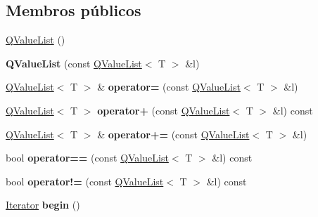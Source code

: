 \subsection*{Membros públicos}
\begin{DoxyCompactItemize}
\item 
\hyperlink{class_q_value_list_a45441fbf512c04334f495ba5901031b2}{Q\-Value\-List} ()
\item 
\hypertarget{class_q_value_list_a07510277968aa70dd9e2cb849ab81f75}{{\bfseries Q\-Value\-List} (const \hyperlink{class_q_value_list}{Q\-Value\-List}$<$ T $>$ \&l)}\label{class_q_value_list_a07510277968aa70dd9e2cb849ab81f75}

\item 
\hypertarget{class_q_value_list_aab25b9fcbb20ce1737cd022c1df6f1a5}{\hyperlink{class_q_value_list}{Q\-Value\-List}$<$ T $>$ \& {\bfseries operator=} (const \hyperlink{class_q_value_list}{Q\-Value\-List}$<$ T $>$ \&l)}\label{class_q_value_list_aab25b9fcbb20ce1737cd022c1df6f1a5}

\item 
\hypertarget{class_q_value_list_ae4cbfbf3fe68591b90f1595a68e8818a}{\hyperlink{class_q_value_list}{Q\-Value\-List}$<$ T $>$ {\bfseries operator+} (const \hyperlink{class_q_value_list}{Q\-Value\-List}$<$ T $>$ \&l) const }\label{class_q_value_list_ae4cbfbf3fe68591b90f1595a68e8818a}

\item 
\hypertarget{class_q_value_list_a07c5bb913041fa24a31da018a85ba114}{\hyperlink{class_q_value_list}{Q\-Value\-List}$<$ T $>$ \& {\bfseries operator+=} (const \hyperlink{class_q_value_list}{Q\-Value\-List}$<$ T $>$ \&l)}\label{class_q_value_list_a07c5bb913041fa24a31da018a85ba114}

\item 
\hypertarget{class_q_value_list_acf3cbcf4c11360354b90d148ad6d5d7e}{bool {\bfseries operator==} (const \hyperlink{class_q_value_list}{Q\-Value\-List}$<$ T $>$ \&l) const }\label{class_q_value_list_acf3cbcf4c11360354b90d148ad6d5d7e}

\item 
\hypertarget{class_q_value_list_a2e64db9b439c3f2b205a6b254776f61d}{bool {\bfseries operator!=} (const \hyperlink{class_q_value_list}{Q\-Value\-List}$<$ T $>$ \&l) const }\label{class_q_value_list_a2e64db9b439c3f2b205a6b254776f61d}

\item 
\hypertarget{class_q_value_list_a2387033802383edbdc95f9bbb12a707e}{\hyperlink{class_q_value_list_a1f559ae0c1d2e8f55846ea5d1ea60977}{Iterator} {\bfseries begin} ()}\label{class_q_value_list_a2387033802383edbdc95f9bbb12a707e}


\end{DoxyCompactItemize}
